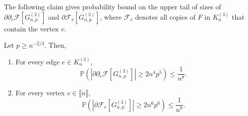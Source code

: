 \documentclass[11pt,a4paper,oneside,reqno]{amsart}
\newcommand{\Gnp}{G_{n, p}^{(3)}}
\newcommand{\cF}{\mathcal{F}}
\renewcommand{\Pr}{\mathbb{P}}
\newcommand{\1}{\mathbbm{1}} %
\newcommand{\br}[1]{\llbracket{#1}\rrbracket}
\renewcommand{\le}{\leqslant}
\renewcommand{\ge}{\geqslant}
\begin{document}
The following claim gives probability bound on the upper tail of sizes of $\partial\partial_e \cF\left[\Gnp\right]$ and $\partial \cF_v \left[\Gnp\right]$, where $\cF_v$ denotes all copies of $F$ in $K_n^{(3)}$ that contain the vertex $v$.
\begin{claim}\label{claim:Fano minus edge}
    Let $p \ge n^{-2/3}$. Then,
    \begin{enumerate}
        \item For every edge $e \in K_n^{(3)}$, 
        \[
            \Pr\left(\left|\partial\partial_e \cF\left[\Gnp\right]\right| \ge 2n^4 p^5\right) \le \frac{1}{n^8}.
        \]        
        \item For every vertex $v \in \br{n}$, 
        \[
            \Pr\left(\left|\partial \cF_v \left[\Gnp\right]\right| \ge 2n^6 p^6\right) \le \frac{1}{n^8}.
        \]
    \end{enumerate}
\end{claim}
\end{document}
